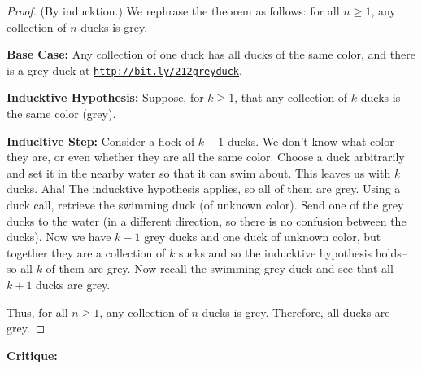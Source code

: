 \documentclass[11pt]{article}		%
\theoremstyle{definition}
\begin{document}
\begin{proof}
(By inducktion.)
We rephrase the theorem as follows: for all $n\ge 1$, any collection of $n$ ducks is grey.

\textbf{Base Case:} Any collection of one duck has all ducks of the same color, and there is a grey duck at {\tt \href{http://bit.ly/212greyduck}{http://bit.ly/212greyduck}}.

\textbf{Inducktive Hypothesis:} Suppose, for $k \ge 1$, that any collection of $k$ ducks is the same color (grey).

\textbf{Inducltive Step:} Consider a flock of $k+1$ ducks. We don't know what color they are, or even whether they are all the same color. Choose a duck arbitrarily and set it in the nearby water so that it can swim about. This leaves us with $k$ ducks. Aha! The inducktive hypothesis applies, so all of them are grey. Using a duck call, retrieve the swimming duck (of unknown color). Send one of the grey ducks to the water (in a different direction, so there is no confusion between the ducks). Now we have $k-1$ grey ducks and one duck of unknown color, but together they are a collection of $k$ sucks and so the inducktive hypothesis holds--so all $k$ of them are grey. Now recall the swimming grey duck and see that all $k+1$ ducks are grey.

Thus, for all $n \ge 1$, any collection of $n$ ducks is grey. Therefore, all ducks are grey.
\end{proof}


\noindent\textbf{Critique:} 
\end{document}
